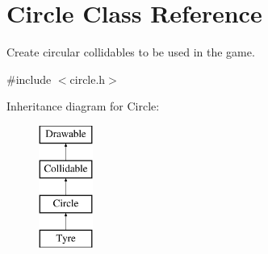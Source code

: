 \hypertarget{class_circle}{}\section{Circle Class Reference}
\label{class_circle}


Create circular collidables to be used in the game.  




{\ttfamily \#include $<$circle.\+h$>$}

Inheritance diagram for Circle\+:\begin{figure}[H]
\begin{center}
\leavevmode
\includegraphics[height=4.000000cm]{class_circle}
\end{center}
\end{figure}
